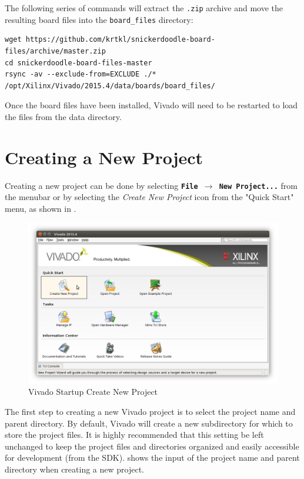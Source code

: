 \noindent
The following series of commands will extract the \texttt{.zip} archive and move the resulting board files into the \texttt{board\_files} directory: \\

\begin{fullwidth}
\begin{lstlisting}[style=text]
wget https://github.com/krtkl/snickerdoodle-board-files/archive/master.zip
cd snickerdoodle-board-files-master
rsync -av --exclude-from=EXCLUDE ./* /opt/Xilinx/Vivado/2015.4/data/boards/board_files/
\end{lstlisting}
\end{fullwidth}

\noindent
Once the board files have been installed, Vivado will need to be restarted to load the files from the data directory.

\section{Creating a New Project}

Creating a new project can be done by selecting \texttt{\bfseries File $\rightarrow$ New Project...} from the menubar or by selecting the \textit{Create New Project} icon from the "Quick Start" menu, as shown in . \\


\begin{figure}
	\centering
	\includegraphics{images/Vivado_Start_Create_Project.png}
	\caption[Vivado Startup Create New Project]{Vivado Startup Create New Project}
	\label{fig:vivadostartcreate}
\end{figure}


\noindent
The first step to creating a new Vivado project is to select the project name and parent directory. By default, Vivado will create a new subdirectory for which to store the project files. It is highly recommended that this setting be left unchanged to keep the project files and directories organized and easily accessible for development (\ie from the SDK).  shows the input of the project name and parent directory when creating a new project. \\

